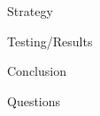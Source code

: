 \documentclass[aspectratio=169,xcolor=dvipsnames]{beamer}
\begin{document}
\begin{frame}{Strategy} %

\end{frame}

\begin{frame}{Testing/Results} %

\end{frame}


\begin{frame}{Conclusion} %
\end{frame}


\begingroup
{} %
\begin{frame}
  \Huge{\centerline{Questions}}
\end{frame}
\endgroup

\end{document}

